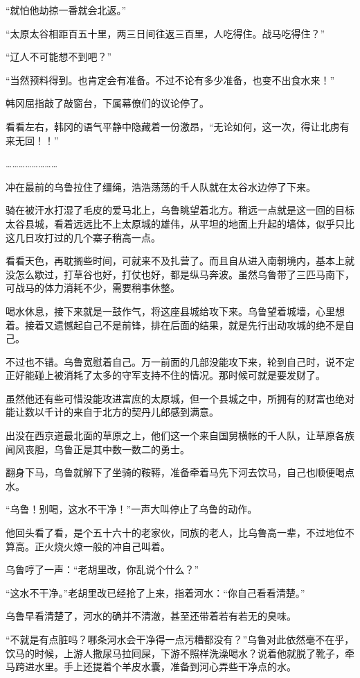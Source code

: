 “就怕他劫掠一番就会北返。”

“太原太谷相距百五十里，两三日间往返三百里，人吃得住。战马吃得住？”

“辽人不可能想不到吧？”

“当然预料得到。也肯定会有准备。不过不论有多少准备，也变不出食水来！”

韩冈屈指敲了敲窗台，下属幕僚们的议论停了。

看看左右，韩冈的语气平静中隐藏着一份激昂，“无论如何，这一次，得让北虏有来无回！！”

……………………

冲在最前的乌鲁拉住了缰绳，浩浩荡荡的千人队就在太谷水边停了下来。

骑在被汗水打湿了毛皮的爱马北上，乌鲁眺望着北方。稍远一点就是这一回的目标太谷县城，看着远远比不上太原城的雄伟，从平坦的地面上升起的墙体，似乎只比这几日攻打过的几个寨子稍高一点。

看看天色，再耽搁些时间，可就来不及扎营了。而且自从进入南朝境内，基本上就没怎么歇过，打草谷也好，打仗也好，都是纵马奔波。虽然乌鲁带了三匹马南下，可战马的体力消耗不少，需要稍事休整。

喝水休息，接下来就是一鼓作气，将这座县城给攻下来。乌鲁望着城墙，心里想着。接着又遗憾起自己不是前锋，排在后面的结果，就是先行出动攻城的绝不是自己。

不过也不错。乌鲁宽慰着自己。万一前面的几部没能攻下来，轮到自己时，说不定正好能碰上被消耗了太多的守军支持不住的情况。那时候可就是要发财了。

虽然他还有些可惜没能攻进富庶的太原城，但一个县城之中，所拥有的财富也绝对能让数以千计的来自于北方的契丹儿郎感到满意。

出没在西京道最北面的草原之上，他们这一个来自国舅横帐的千人队，让草原各族闻风丧胆，乌鲁正是其中数一数二的勇士。

翻身下马，乌鲁就解下了坐骑的鞍鞯，准备牵着马先下河去饮马，自己也顺便喝点水。

“乌鲁！别喝，这水不干净！”一声大叫停止了乌鲁的动作。

他回头看了看，是个五十六十的老家伙，同族的老人，比乌鲁高一辈，不过地位不算高。正火烧火燎一般的冲自己叫着。

乌鲁哼了一声：“老胡里改，你乱说个什么？”

“这水不干净。”老胡里改已经抢了上来，指着河水：“你自己看看清楚。”

乌鲁早看清楚了，河水的确并不清澈，甚至还带着若有若无的臭味。

“不就是有点脏吗？哪条河水会干净得一点污糟都没有？”乌鲁对此依然毫不在乎，饮马的时候，上游人撒尿马拉囘屎，下游不照样洗澡喝水？说着他就脱了靴子，牵马跨进水里。手上还提着个羊皮水囊，准备到河心弄些干净点的水。

